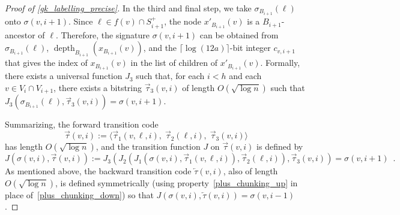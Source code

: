 \documentclass{patmorin}
\DeclareMathOperator{\depth}{depth}
\newcommand{\Oh}{O}
\begin{document}
\begin{proof}[Proof of \cref{gk_labelling_precise}]
  In the third and final step, we take $\sigma_{B_{i+1}}(\ell)$ onto $\sigma(v,i+1)$.  Since $\ell\in f(v)\cap S^+_{i+1}$, the node $x'_{B_{i+1}}(v)$ is a $B_{i+1}$-ancestor of $\ell$.  Therefore, the signature $\sigma(v,i+1)$ can be obtained from $\sigma_{B_{i+1}}(\ell)$, $\depth_{B_{i+1}}(x_{B_{i+1}}(v))$, and the $\lceil\log(12a)\rceil$-bit integer $c_{v,i+1}$ that gives the index of $x_{B_{i+1}}(v)$ in the list of children of $x'_{B_{i+1}}(v)$.   Formally, there exists a universal function $J_3$ such that, for each $i< h$ and each $v\in V_i\cap V_{i+1}$, there exists a bitstring $\overrightarrow{\tau}_3(v,i)$ of length $\Oh(\sqrt{\log n})$ such that $J_3(\sigma_{B_{i+1}}(\ell),\overrightarrow{\tau}_3(v,i))=\sigma(v,i+1)$.
  
  Summarizing, the forward transition code
  \[
     \overrightarrow{\tau}(v,i):=\langle \overrightarrow{\tau}_1(v,\ell,i),\; \overrightarrow{\tau}_2(\ell, i),\;\overrightarrow{\tau}_3(v,i)\rangle 
  \]
  has length $\Oh(\sqrt{\log n})$, and the transition function $J$ on $\overrightarrow{\tau}(v,i)$ is defined by
  \[
     J(\sigma(v,i),\overrightarrow{\tau}(v,i)) := J_3(J_2(J_1(\sigma(v,i), \overrightarrow{\tau}_1(v,\ell,i)), \overrightarrow{\tau}_2(\ell, i)), \overrightarrow{\tau}_3(v,i)) = \sigma(v,i+1) \enspace .
  \]
  As mentioned above, the backward transition code $\overleftarrow{\tau}(v,i)$, also of length $O(\sqrt{\log n})$, is defined symmetrically (using property~\ref{plus_chunking_up} in place of~\ref{plus_chunking_down}) so that $J(\sigma(v,i),\overleftarrow{\tau}(v,i)) = \sigma(v,i-1)$.




\end{proof}
\end{document}
